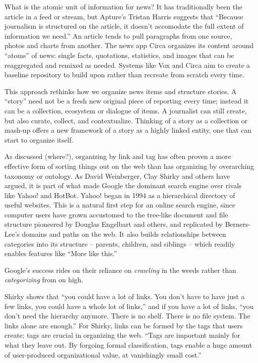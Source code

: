 What is the atomic unit of information for news? It has traditionally been the article in a feed or stream, but Apture's Tristan Harris suggests that ``Because journalism is structured on the article, it doesn't accomodate the full extent of information we need.'' An article tends to pull paragraphs from one source, photos and charts from another. The news app Circa organizes its content around ``atoms'' of news: single facts, quotations, statistics, and images that can be reaggregated and remixed as needed. Systems like Vox and Circa aim to create a baseline repository to build upon rather than recreate from scratch every time.

This approach rethinks how we organize news items and structure stories. A ``story'' need not be a fresh new original piece of reporting every time; instead it can be a collection, ecosystem or dialogue of items. A journalist can still create, but also curate, collect, and contextualize. Thinking of a story as a collection or mash-up offers a new framework of a story as a highly linked entity, one that can start to organize itself.

As discussed (where?), organizing by link and tag has often proven a more effective form of sorting things out on the web than has organizing by overarching taxonomy or ontology. As David Weinberger, Clay Shirky and others have argued, it is part of what made Google the dominant search engine over rivals like Yahoo! and HotBot. Yahoo! began in 1994 as a hierarchical directory of useful websites. This is a natural first step for an online search engine, since computer users have grown accustomed to the tree-like document and file structure pioneered by Douglas Engelbart and others, and replicated by Berners-Lee's domains and paths on the web. It also builds relationships between categories into its structure -- parents, children, and siblings -- which readily enables features like ``More like this.''

Google's success rides on their reliance on \emph{crawling} in the weeds rather than \emph{categorizing} from on high.

Shirky shows that ``you could have a lot of links. You don't have to have just a few links, you could have a whole lot of links,'' and if you have a lot of links, ``you don't need the hierarchy anymore. There is no shelf. There is no file system. The links alone are enough.'' For Shirky, links can be formed by the tags that users create; tags are crucial in organizing the web. ``Tags are important mainly for what they leave out. By forgoing formal classification, tags enable a huge amount of user-produced organizational value, at vanishingly small cost.''

